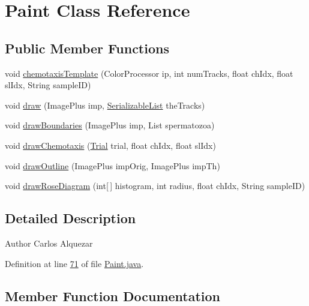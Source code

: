 \hypertarget{classfunctions_1_1_paint}{}\section{Paint Class Reference}
\label{classfunctions_1_1_paint}
\subsection*{Public Member Functions}
\begin{DoxyCompactItemize}
\item 
void \hyperlink{classfunctions_1_1_paint_aaec84e76dfa781152d5fb9ba9c2a46a4}{chemotaxis\+Template} (Color\+Processor ip, int num\+Tracks, float ch\+Idx, float sl\+Idx, String sample\+ID)
\item 
void \hyperlink{classfunctions_1_1_paint_a86f95f4ee27f7ce9ab517f4e322c9612}{draw} (Image\+Plus imp, \hyperlink{classdata_1_1_serializable_list}{Serializable\+List} the\+Tracks)
\item 
void \hyperlink{classfunctions_1_1_paint_af5c5db6d9fe79eafc658aeb3e0d17b1f}{draw\+Boundaries} (Image\+Plus imp, List spermatozoa)
\item 
void \hyperlink{classfunctions_1_1_paint_a21dbba9326aa66f10d1dfccb836c14d9}{draw\+Chemotaxis} (\hyperlink{classdata_1_1_trial}{Trial} trial, float ch\+Idx, float sl\+Idx)
\item 
void \hyperlink{classfunctions_1_1_paint_a79f677db3c0f2261152a784802dab3c2}{draw\+Outline} (Image\+Plus imp\+Orig, Image\+Plus imp\+Th)
\item 
void \hyperlink{classfunctions_1_1_paint_ae6e7f899e277190943b0c57232976e97}{draw\+Rose\+Diagram} (int\mbox{[}$\,$\mbox{]} histogram, int radius, float ch\+Idx, String sample\+ID)
\end{DoxyCompactItemize}


\subsection{Detailed Description}
\begin{DoxyAuthor}{Author}
Carlos Alquezar 
\end{DoxyAuthor}


Definition at line \hyperlink{_paint_8java_source_l00071}{71} of file \hyperlink{_paint_8java_source}{Paint.\+java}.



\subsection{Member Function Documentation}
\hypertarget{classfunctions_1_1_paint_aaec84e76dfa781152d5fb9ba9c2a46a4}{}\label{classfunctions_1_1_paint_aaec84e76dfa781152d5fb9ba9c2a46a4} 
